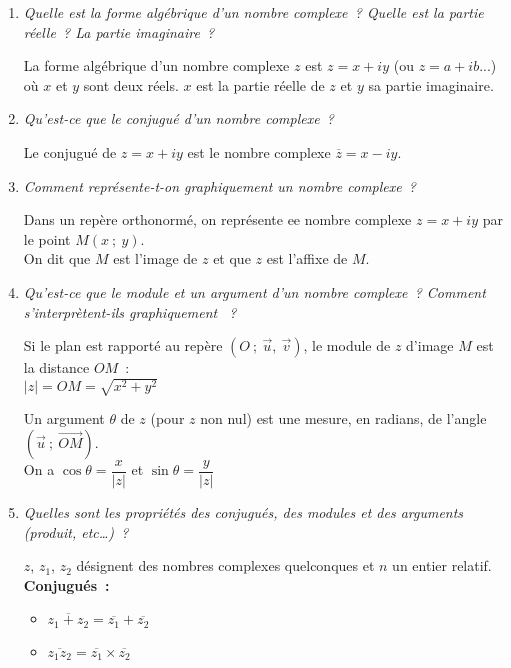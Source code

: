 \begin{reponses}
     \begin{enumerate}
          \item %
          \textit{Quelle est la forme algébrique d'un nombre complexe~? Quelle est la partie réelle~? La partie imaginaire~?}
          \par
          La forme algébrique d'un nombre complexe $z$ est $z=x+iy$ (ou $z=a+ib$...) où $x$ et $y$ sont deux réels.
          $x$ est la partie réelle de $z$ et $y$ sa partie imaginaire.
          \item %
          \textit{ Qu'est-ce que le conjugué d'un nombre complexe~?}
          \par
          Le conjugué de $z=x+iy$ est le nombre complexe $\overline{z}=x-iy$.
          \item %
          \textit{Comment représente-t-on graphiquement un nombre complexe~?}
          \par
          Dans un repère orthonormé, on représente ee nombre complexe $z=x+iy$ par le point $M(x~;~y)$.\\
          On dit que $M$ est l'image de $z$ et que $z$ est l'affixe de $M$.
          \item %
          \textit{Qu'est-ce que le module et un argument d'un nombre complexe~? Comment s'interprètent-ils graphiquement ~?}
          \par
          Si le plan est rapporté au repère $(O~;~\vec{u},~\vec{v})$, le module de $z$ d'image $M$ est la distance $OM$~:\\
          $|z|=OM=\sqrt{x^2+y^2}$
          \par
          Un argument $\theta$ de $z$ (pour $z$ non nul) est une mesure, en radians, de l'angle $( \vec{u}~;~\vec{OM})$.\\
          On a $\cos \theta = \dfrac{x}{|z|}$ et  $\sin \theta = \dfrac{y}{|z|}$
          \item %
          \textit{Quelles sont les propriétés des conjugués, des modules et des arguments (produit, etc…)~?}
          \par
          $z$, $z_1$, $z_2$ désignent des nombres complexes quelconques et $n$ un entier relatif.
          \textbf{Conjugués~:}
          \begin{itemize}
               \item $\overline{z_1+z_2} = \overline{z_1}+\overline{z_2}$
               \item $\overline{z_1z_2} = \overline{z_1}\times \overline{z_2}$

\end{itemize}
\end{enumerate}
\end{reponses}
